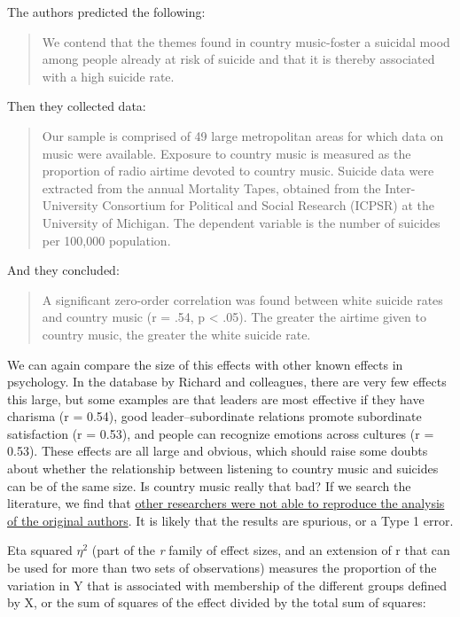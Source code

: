 \documentclass[
]{krantz}
\begin{document}
The authors predicted the following:

\begin{quote}
We contend that the themes found in country music-foster a suicidal mood among people already at risk of suicide and that it is thereby associated with a high suicide rate.
\end{quote}

Then they collected data:

\begin{quote}
Our sample is comprised of 49 large metropolitan areas for which data on music were available. Exposure to country music is measured as the proportion of radio airtime devoted to country music. Suicide data were extracted from the annual Mortality Tapes, obtained from the Inter-University Consortium for Political and Social Research (ICPSR) at the University of Michigan. The dependent variable is the number of suicides per 100,000 population.
\end{quote}

And they concluded:

\begin{quote}
A significant zero-order correlation was found between white suicide rates and country music (r = .54, p \textless{} .05). The greater the airtime given to country music, the greater the white suicide rate.
\end{quote}

We can again compare the size of this effects with other known effects in psychology. In the database by Richard and colleagues, there are very few effects this large, but some examples are that leaders are most effective if they have charisma (r = 0.54), good leader--subordinate relations promote subordinate satisfaction (r = 0.53), and people can recognize emotions across cultures (r = 0.53). These effects are all large and obvious, which should raise some doubts about whether the relationship between listening to country music and suicides can be of the same size. Is country music really that bad? If we search the literature, we find that \href{http://sf.oxfordjournals.org/content/74/1/327.short}{other researchers were not able to reproduce the analysis of the original authors}. It is likely that the results are spurious, or a Type 1 error.

Eta squared \(\eta^2\) (part of the \emph{r} family of effect sizes, and an extension of r that can be used for more than two sets of observations) measures the proportion of the variation in Y that is associated with membership of the different groups deﬁned by X, or the sum of squares of the effect divided by the total sum of squares:
\end{document}
